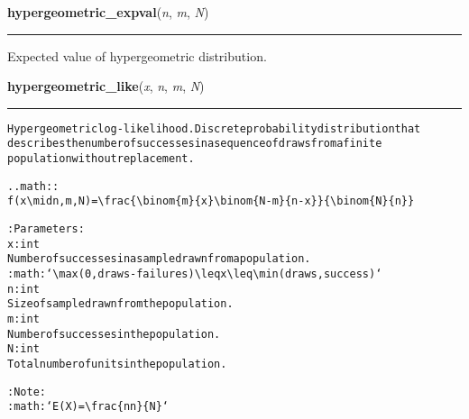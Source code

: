     \label{pymc:distributions:hypergeometric_expval}

    \vspace{0.5ex}

    \begin{boxedminipage}{\textwidth}

    \raggedright \textbf{hypergeometric\_expval}(\textit{n}, \textit{m}, \textit{N})

    \vspace{-1.5ex}

    \rule{\textwidth}{0.5\fboxrule}

Expected value of hypergeometric distribution.
    \vspace{1ex}

    \end{boxedminipage}

    \label{pymc:distributions:hypergeometric_like}

    \vspace{0.5ex}

    \begin{boxedminipage}{\textwidth}

    \raggedright \textbf{hypergeometric\_like}(\textit{x}, \textit{n}, \textit{m}, \textit{N})

    \vspace{-1.5ex}

    \rule{\textwidth}{0.5\fboxrule}
\begin{alltt}
Hypergeometric log-likelihood. Discrete probability distribution that
describes the number of successes in a sequence of draws from a finite
population without replacement.

.. math::
    f(x {\textbackslash}mid n, m, N) = {\textbackslash}frac\{{\textbackslash}binom\{m\}\{x\}{\textbackslash}binom\{N-m\}\{n-x\}\}\{{\textbackslash}binom\{N\}\{n\}\}

:Parameters:
  x : int
    Number of successes in a sample drawn from a population.
    :math:`{\textbackslash}max(0, draws-failures) {\textbackslash}leq x {\textbackslash}leq {\textbackslash}min(draws, success)`
  n : int
    Size of sample drawn from the population.
  m : int
    Number of successes in the population.
  N : int
    Total number of units in the population.

:Note:
  :math:`E(X) = {\textbackslash}frac\{n n\}\{N\}`
\end{alltt}

    \vspace{1ex}

    \end{boxedminipage}

